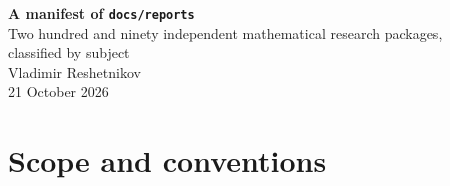 \documentclass[11pt]{article}
\begin{document}
\begin{center}
  {\LARGE\bfseries\color{Ink} A manifest of \texttt{docs/reports}}\\[0.6em]
  {\large Two hundred and ninety independent mathematical research packages,\\
   classified by subject}\\[1.0em]
  {\normalsize Vladimir Reshetnikov}\\[0.3em]
  {\normalsize 21 October 2026}
\end{center}

\vspace{0.8em}

\section{Scope and conventions}
\end{document}
